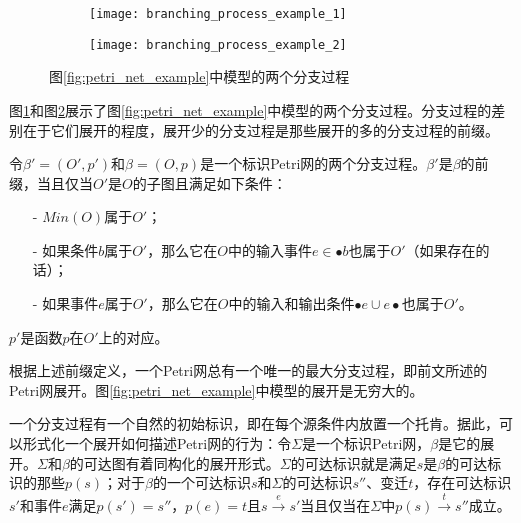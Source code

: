\begin{figure}[htbp]
  \centering
  \begin{subfigure}{1\textwidth}
  	\centering
  	\texttt{[image: branching\_process\_example\_1]}
  	\caption{\label{fig:branching_process_example_1}}
  \end{subfigure}
  \begin{subfigure}{1\textwidth}
  	\vspace{1em}
  	\centering
  	\texttt{[image: branching\_process\_example\_2]}
  	\caption{\label{fig:branching_process_example_2}}
  \end{subfigure}
  \vspace{6pt}
  \caption{图\ref{fig:petri_net_example}中模型的两个分支过程}
  \label{fig:branching_process_example}
\end{figure}

图\ref{fig:branching_process_example_1}和图\ref{fig:branching_process_example_2}展示了图\ref{fig:petri_net_example}中模型的两个分支过程。分支过程的差别在于它们展开的程度，展开少的分支过程是那些展开的多的分支过程的前缀。

\begin{definition}[分支过程前缀]\label{def:branching_process_prefix}
令$\beta'=(O',p')$和$\beta=(O,p)$是一个标识Petri网的两个分支过程。$\beta'$是$\beta$的前缀，当且仅当$O'$是$O$的子图且满足如下条件：
  \begin{itemize}
  	\item[-] $Min(O)$属于$O'$；
  	\item[-] 如果条件$b$属于$O'$，那么它在$O$中的输入事件$e\in\bullet b$也属于$O'$（如果存在的话）；
  	\item[-] 如果事件$e$属于$O'$，那么它在$O$中的输入和输出条件$\bullet e\cup e\bullet$也属于$O'$。
  \end{itemize}
  $p'$是函数$p$在$O'$上的对应。
\end{definition}

根据上述前缀定义，一个Petri网总有一个唯一的最大分支过程\cite{engelfriet1991branching}，即前文所述的Petri网展开。图\ref{fig:petri_net_example}中模型的展开是无穷大的。

一个分支过程有一个自然的初始标识，即在每个源条件内放置一个托肯。据此，可以形式化一个展开如何描述Petri网的行为：令$\Sigma$是一个标识Petri网，$\beta$是它的展开。$\Sigma$和$\beta$的可达图有着同构化的展开形式。$\Sigma$的可达标识就是满足$s$是$\beta$的可达标识的那些$p(s)$；对于$\beta$的一个可达标识$s$和$\Sigma$的可达标识$s''$、变迁$t$，存在可达标识$s'$和事件$e$满足$p(s')=s''$，$p(e)=t$且$s\overset{e}{\rightarrow}s'$当且仅当在$\Sigma$中$p(s)\overset{t}{\rightarrow}s''$成立。

